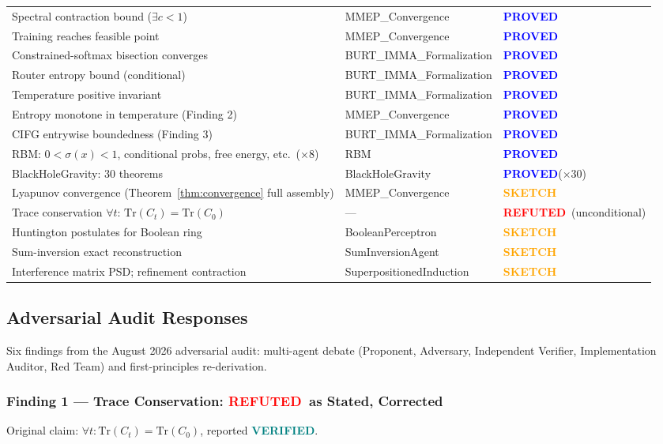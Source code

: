 \documentclass[11pt,letterpaper]{article}
\newcommand{\PROVED}{\textbf{\textcolor{blue}{PROVED}}}
\newcommand{\VERIFIED}{\textbf{\textcolor{teal}{VERIFIED}}}
\newcommand{\SKETCH}{\textbf{\textcolor{orange}{SKETCH}}}
\newcommand{\REFUTED}{\textbf{\textcolor{red}{REFUTED}}}
\begin{document}
\begin{longtable}{p{8cm}p{3.5cm}l}
Spectral contraction bound ($\exists c < 1$) & MMEP\_Convergence & \PROVED \\
Training reaches feasible point & MMEP\_Convergence & \PROVED \\
Constrained-softmax bisection converges & BURT\_IMMA\_Formalization & \PROVED \\
Router entropy bound (conditional) & BURT\_IMMA\_Formalization & \PROVED \\
Temperature positive invariant & BURT\_IMMA\_Formalization & \PROVED \\
Entropy monotone in temperature (Finding 2) & MMEP\_Convergence & \PROVED \\
CIFG entrywise boundedness (Finding 3) & BURT\_IMMA\_Formalization & \PROVED \\
RBM: $0 < \sigma(x) < 1$, conditional probs, free energy, etc.\ ($\times 8$) & RBM & \PROVED \\
BlackHoleGravity: 30 theorems & BlackHoleGravity & \PROVED ($\times 30$) \\
\midrule
Lyapunov convergence (Theorem~\ref{thm:convergence} full assembly) & MMEP\_Convergence & \SKETCH \\
Trace conservation $\forall t$: $\mathrm{Tr}(C_t) = \mathrm{Tr}(C_0)$ & --- & \REFUTED\ (unconditional) \\
Huntington postulates for Boolean ring & BooleanPerceptron & \SKETCH \\
Sum-inversion exact reconstruction & SumInversionAgent & \SKETCH \\
Interference matrix PSD; refinement contraction & SuperpositionedInduction & \SKETCH \\
\bottomrule
\end{longtable}

\subsection{Adversarial Audit Responses}
\label{sec:audit}

Six findings from the August 2026 adversarial audit: multi-agent debate
(Proponent, Adversary, Independent Verifier, Implementation Auditor, Red Team)
and first-principles re-derivation.

\subsubsection*{Finding 1 --- Trace Conservation: \REFUTED\ as Stated, Corrected}

Original claim: $\forall t: \mathrm{Tr}(C_t) = \mathrm{Tr}(C_0)$, reported \VERIFIED.
\end{document}
